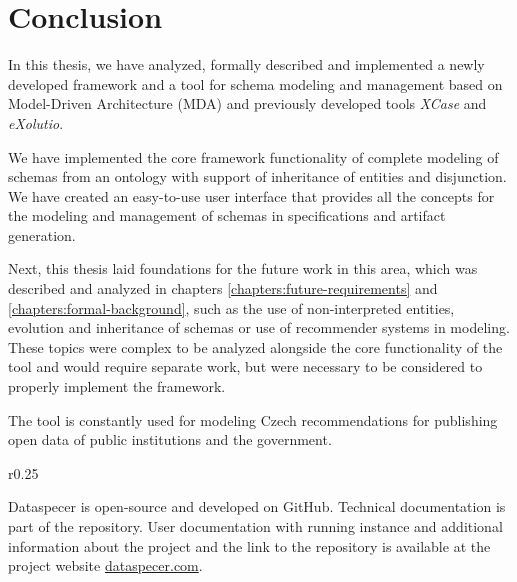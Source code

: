 \chapter*{Conclusion}

In this thesis, we have analyzed, formally described and implemented a newly developed framework and a tool for schema modeling and management based on Model-Driven Architecture (MDA) and previously developed tools \textit{XCase} and \textit{eXolutio}.

We have implemented the core framework functionality of complete modeling of schemas from an ontology with support of inheritance of entities and disjunction. We have created an easy-to-use user interface that provides all the concepts for the modeling and management of schemas in specifications and artifact generation.

Next, this thesis laid foundations for the future work in this area, which was described and analyzed in chapters \ref{chapters:future-requirements} and \ref{chapters:formal-background}, such as the use of non-interpreted entities, evolution and inheritance of schemas or use of recommender systems in modeling. These topics were complex to be analyzed alongside the core functionality of the tool and would require separate work, but were necessary to be considered to properly implement the framework.

The tool is constantly used for modeling Czech recommendations for publishing open data of public institutions and the government.

\bigskip

\begin{wrapfigure}{r}{0.25\textwidth}
    \centering
    \vspace{-\intextsep}
    \hspace*{-.75\columnsep}
\end{wrapfigure}
Dataspecer is open-source and developed on GitHub. Technical documentation is part of the repository. User documentation with running instance and additional information about the project and the link to the repository is available at the project website \url{dataspecer.com}.

\vfill